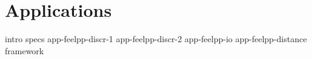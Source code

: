 \chapter{Applications}
\label{chap:applications}

{intro}
{specs}
{app-feelpp-discr-1}
{app-feelpp-discr-2}
{app-feelpp-io}
{app-feelpp-distance}
{framework}

